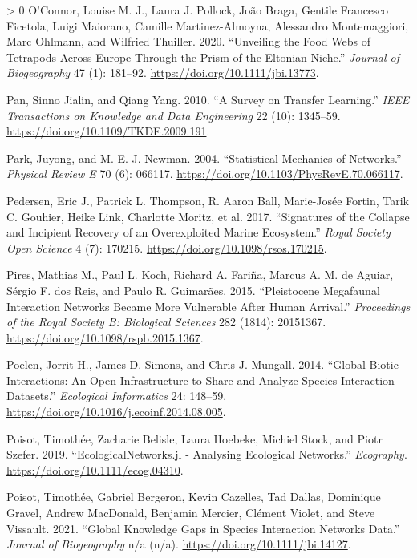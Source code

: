 \documentclass[10pt,oneside]{article}
\newlength{\cslhangindent}
\newenvironment{CSLReferences}[3] %
 {%
  \setlength{\parindent}{0pt}
  \ifodd #1 \everypar{\setlength{\hangindent}{\cslhangindent}}\ignorespaces\fi
  \ifnum #2 > 0
  \setlength{\parskip}{#2\baselineskip}
  \fi
 }%
 {}
\begin{document}
\begin{CSLReferences}{1}{0}
\leavevmode\hypertarget{ref-OConnor2020UnvFoo}{}%
O'Connor, Louise M. J., Laura J. Pollock, João Braga, Gentile Francesco
Ficetola, Luigi Maiorano, Camille Martinez-Almoyna, Alessandro
Montemaggiori, Marc Ohlmann, and Wilfried Thuiller. 2020. {``Unveiling
the Food Webs of Tetrapods Across Europe Through the Prism of the
Eltonian Niche.''} \emph{Journal of Biogeography} 47 (1): 181--92.
\url{https://doi.org/10.1111/jbi.13773}.

\leavevmode\hypertarget{ref-Pan2010SurTra}{}%
Pan, Sinno Jialin, and Qiang Yang. 2010. {``A Survey on Transfer
Learning.''} \emph{IEEE Transactions on Knowledge and Data Engineering}
22 (10): 1345--59. \url{https://doi.org/10.1109/TKDE.2009.191}.

\leavevmode\hypertarget{ref-Park2004StaMec}{}%
Park, Juyong, and M. E. J. Newman. 2004. {``Statistical Mechanics of
Networks.''} \emph{Physical Review E} 70 (6): 066117.
\url{https://doi.org/10.1103/PhysRevE.70.066117}.

\leavevmode\hypertarget{ref-Pedersen2017SigCol}{}%
Pedersen, Eric J., Patrick L. Thompson, R. Aaron Ball, Marie-Josée
Fortin, Tarik C. Gouhier, Heike Link, Charlotte Moritz, et al. 2017.
{``Signatures of the Collapse and Incipient Recovery of an Overexploited
Marine Ecosystem.''} \emph{Royal Society Open Science} 4 (7): 170215.
\url{https://doi.org/10.1098/rsos.170215}.

\leavevmode\hypertarget{ref-Pires2015PleMeg}{}%
Pires, Mathias M., Paul L. Koch, Richard A. Fariña, Marcus A. M. de
Aguiar, Sérgio F. dos Reis, and Paulo R. Guimarães. 2015. {``Pleistocene
Megafaunal Interaction Networks Became More Vulnerable After Human
Arrival.''} \emph{Proceedings of the Royal Society B: Biological
Sciences} 282 (1814): 20151367.
\url{https://doi.org/10.1098/rspb.2015.1367}.

\leavevmode\hypertarget{ref-Poelen2014GloBio}{}%
Poelen, Jorrit H., James D. Simons, and Chris J. Mungall. 2014.
{``Global Biotic Interactions: An Open Infrastructure to Share and
Analyze Species-Interaction Datasets.''} \emph{Ecological Informatics}
24: 148--59. \url{https://doi.org/10.1016/j.ecoinf.2014.08.005}.

\leavevmode\hypertarget{ref-Poisot2019EcoJl}{}%
Poisot, Timothée, Zacharie Belisle, Laura Hoebeke, Michiel Stock, and
Piotr Szefer. 2019. {``EcologicalNetworks.jl - Analysing Ecological
Networks.''} \emph{Ecography}. \url{https://doi.org/10.1111/ecog.04310}.

\leavevmode\hypertarget{ref-Poisot2021GloKno}{}%
Poisot, Timothée, Gabriel Bergeron, Kevin Cazelles, Tad Dallas,
Dominique Gravel, Andrew MacDonald, Benjamin Mercier, Clément Violet,
and Steve Vissault. 2021. {``Global Knowledge Gaps in Species
Interaction Networks Data.''} \emph{Journal of Biogeography} n/a (n/a).
\url{https://doi.org/10.1111/jbi.14127}.


\end{CSLReferences}
\end{document}
